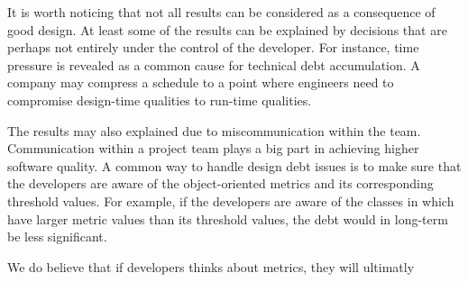 








It is worth noticing that not all results can be considered as a consequence of good design. At least some of the results can be explained by decisions that are perhaps not entirely under the control of the developer. For instance, time pressure is revealed as a common cause for technical debt accumulation. A company may compress a schedule to a point where engineers need to compromise design-time qualities to run-time qualities.

The results may also explained due to miscommunication within the team. Communication within a project team plays a big part in achieving higher software quality. A common way to handle design debt issues is to make sure that the developers are aware of the object-oriented metrics and its corresponding threshold values. For example, if the developers are aware of the classes in which have larger metric values than its threshold values, the debt would in long-term be less significant. 

We do believe that if developers thinks about metrics, they will ultimatly 